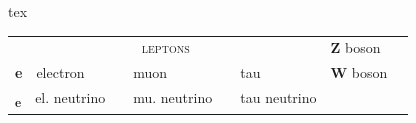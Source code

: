 \begin{codebox}{tex}
\begin{table}[!htb]
\begin{tabular}{lllll}
            \multicolumn{3}{c}{\textsc{leptons}}                                & \textbf{Z} boson                                      &                                                                                                          \\
            \cmidrule(lr){1-3}
            \textbf{e}~~electron                                                & \textbf{\textmu}~~muon                                & \textbf{\texttau}~~tau                                 & \textbf{W} boson            &                   \\
            \textbf{\textnu\textsubscript{e}}~~el. neutrino                     & \textbf{\textnu\textsubscript{\textmu}}~~mu. neutrino & \textbf{\textnu\textsubscript{\texttau}}~~tau neutrino &                             &                   \\
            \bottomrule
        \end{tabular}
    \end{table}
\end{codebox}

